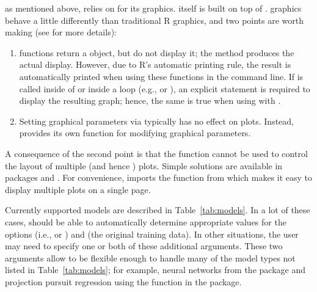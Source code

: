  as mentioned above,  relies on  for its graphics.  itself is built on top of  \citep{grid-pkg}.  graphics behave a little differently than traditional R graphics, and two points are worth making (see  for more details):
\begin{enumerate}
  \item {} functions return a  object, but do not display it; the  method produces the actual display. However, due to R's automatic printing rule, the result is automatically printed when using these functions in the command line. If  is called inside of  or inside a loop (e.g.,  or ), an explicit  statement is required to display the resulting graph; hence, the same is true when using  with .
  \item Setting graphical parameters via  typically has no effect on  plots. Instead,  provides its own  function for modifying graphical parameters.
\end{enumerate}
A consequence of the second point is that the  function cannot be used to control the layout of multiple  (and hence ) plots. Simple solutions are available in packages  \citep{latticeExtra-pkg} and  \citep{gridExtra-pkg}. For convenience,  imports the  function from  which makes it easy to display multiple  plots on a single page.

Currently supported models are described in Table~\ref{tab:models}. In a lot of these cases,  should be able to automatically determine appropriate values for the options  (i.e.,  or ) and  (the original training data). In other situations, the user may need to specify one or both of these additional arguments. These two arguments allow  to be flexible enough to handle many of the model types not listed in Table~\ref{tab:models}; for example, neural networks from the  package \citep{venables-modern-2002} and projection pursuit regression \citep{friedman-ppr-1981} using the  function in the  package.

